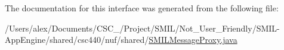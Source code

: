 The documentation for this interface was generated from the following file\-:\begin{DoxyCompactItemize}
\item 
/\-Users/alex/\-Documents/\-C\-S\-C\-\_/\-Project/\-S\-M\-I\-L/\-Not\-\_\-\-User\-\_\-\-Friendly/\-S\-M\-I\-L-\/\-App\-Engine/shared/csc440/nuf/shared/\hyperlink{_s_m_i_l_message_proxy_8java}{S\-M\-I\-L\-Message\-Proxy.\-java}\end{DoxyCompactItemize}
